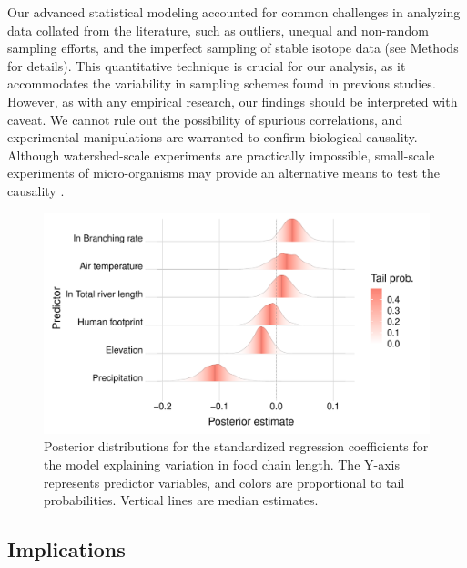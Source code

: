 \documentclass[11pt, class=article, crop=false]{standalone}
\begin{document}
Our advanced statistical modeling accounted for common challenges in analyzing data collated from the literature, such as outliers, unequal and non-random sampling efforts, and the imperfect sampling of stable isotope data (see Methods for details).
This quantitative technique is crucial for our analysis, as it accommodates the variability in sampling schemes found in previous studies.
However, as with any empirical research, our findings should be interpreted with caveat.
We cannot rule out the possibility of spurious correlations, and experimental manipulations are warranted to confirm biological causality.
Although watershed-scale experiments are practically impossible, small-scale experiments of micro-organisms may provide an alternative means to test the causality \citep{altermatt_big_2015, green_long_2023}.

\noindent\makebox[\linewidth]{\rule{\textwidth}{0.4pt}}

\begin{figure}
    \centering
    \includegraphics[width=0.75\linewidth]{output/fig_emp_ridge.pdf}
    \caption{Posterior distributions for the standardized regression coefficients for the model explaining variation in food chain length. The Y-axis represents predictor variables, and colors are proportional to tail probabilities. Vertical lines are median estimates.}
    \label{fig:ridge}
\end{figure}

\noindent\makebox[\linewidth]{\rule{\textwidth}{0.4pt}}

\subsection{Implications}
\end{document}
